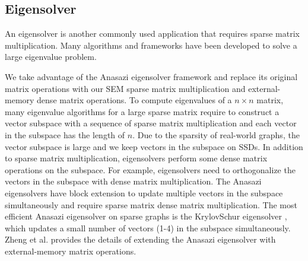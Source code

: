 
\subsection{Eigensolver}
An eigensolver is another commonly used application that requires sparse matrix
multiplication. Many algorithms \cite{Lanczos, IRLM, krylovschur} and frameworks
\cite{arpack, anasazi, slepc} have been developed to solve a large eigenvalue
problem.

We take advantage of the Anasazi eigensolver framework \cite{anasazi} and
replace its original matrix operations with our SEM sparse
matrix multiplication and external-memory dense matrix operations. To compute
eigenvalues of a $n \times n$ matrix, many eigenvalue algorithms for a large
sparse matrix require to construct a vector subspace with a sequence of
sparse matrix multiplication and each vector in the subspace has the length of $n$.
Due to the sparsity of real-world graphs, the vector subspace is large and we keep
vectors in the subspace on SSDs. In addition to sparse matrix
multiplication, eigensolvers perform some dense matrix operations on the subspace.
For example, eigensolvers need to orthogonalize the vectors in the subspace with
dense matrix multiplication. The Anasazi eigensolvers have block extension to
update multiple vectors in the subspace simultaneously and require sparse matrix dense
matrix multiplication. The most efficient Anasazi eigensolver on sparse graphs
is the KrylovSchur eigensolver \cite{krylovschur}, which updates a small number
of vectors (1-4) in the subspace simultaneously. Zheng et al.
\cite{flasheigen} provides the details of extending the Anasazi eigensolver
with external-memory matrix operations.


